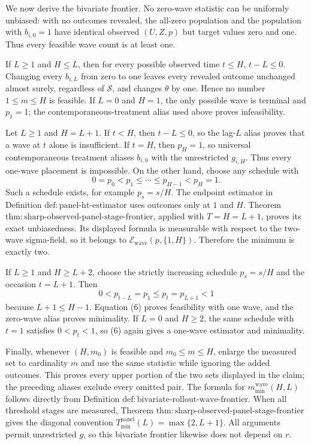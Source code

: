 We now derive the bivariate frontier.  No zero-wave statistic can be uniformly unbiased: with no outcomes revealed, the all-zero population and the population with \(b_{i,0}=1\) have identical observed \((U,Z,p)\) but target values zero and one.  Thus every feasible wave count is at least one.

If \(L\geq1\) and \(H\leq L\), then for every possible observed time \(t\leq H\), \(t-L\leq0\).  Changing every \(b_{i,L}\) from zero to one leaves every revealed outcome unchanged almost surely, regardless of \(\mathcal S\), and changes \(\theta\) by one.  Hence no number \(1\leq m\leq H\) is feasible.  If \(L=0\) and \(H=1\), the only possible wave is terminal and \(p_1=1\); the contemporaneous-treatment alias used above proves infeasibility.

Let \(L\geq1\) and \(H=L+1\).  If \(t<H\), then \(t-L\leq0\), so the lag-\(L\) alias proves that a wave at \(t\) alone is insufficient.  If \(t=H\), then \(p_H=1\), so universal contemporaneous treatment aliases \(b_{i,0}\) with the unrestricted \(g_{i,H}\).  Thus every one-wave placement is impossible.  On the other hand, choose any schedule with
\[
 0=p_0<p_1\leq\cdots\leq p_{H-1}<p_H=1.
\]
Such a schedule exists, for example \(p_s=s/H\).
The endpoint estimator in Definition \(\mathrm{def:panel\text{-}ht\text{-}estimator}\) uses outcomes only at \(1\) and \(H\).  Theorem \(\mathrm{thm:sharp\text{-}observed\text{-}panel\text{-}stage\text{-}frontier}\), applied with \(T=H=L+1\), proves its exact unbiasedness.  Its displayed formula is measurable with respect to the two-wave sigma-field, so it belongs to \(\mathcal E_{\mathrm{wave}}(p,\{1,H\})\).  Therefore the minimum is exactly two.

If \(L\geq1\) and \(H\geq L+2\), choose the strictly increasing schedule \(p_s=s/H\) and the occasion \(t=L+1\).  Then
\[
 0<p_{t-L}=p_1\leq p_t=p_{L+1}<1
\]
because \(L+1\leq H-1\).  Equation (6) proves feasibility with one wave, and the zero-wave alias proves minimality.  If \(L=0\) and \(H\geq2\), the same schedule with \(t=1\) satisfies \(0<p_t<1\), so (6) again gives a one-wave estimator and minimality.

Finally, whenever \((H,m_0)\) is feasible and \(m_0\leq m\leq H\), enlarge the measured set to cardinality \(m\) and use the same statistic while ignoring the added outcomes.  This proves every upper portion of the two sets displayed in the claim; the preceding aliases exclude every omitted pair.  The formula for \(m_{\min}^{\mathrm{wave}}(H,L)\) follows directly from Definition \(\mathrm{def:bivariate\text{-}rollout\text{-}wave\text{-}frontier}\).  When all threshold stages are measured, Theorem \(\mathrm{thm:sharp\text{-}observed\text{-}panel\text{-}stage\text{-}frontier}\) gives the diagonal convention \(T_{\min}^{\mathrm{panel}}(L)=\max\{2,L+1\}\).  All arguments permit unrestricted \(g\), so this bivariate frontier likewise does not depend on \(r\).